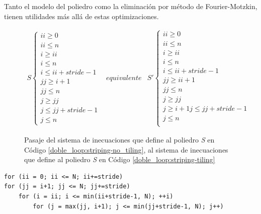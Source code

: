 \documentclass{article}
\begin{document}
Tanto el modelo del poliedro como la eliminación por método de Fourier-Motzkin, tienen utilidades más allá
de estas optimizaciones.

\begin{figure}
\begin{displaymath}
	\begin{array}{rrr}
		S\left\{
			\begin{array}{r}
			ii\geq 0\\
			ii\leq n\\
			i\geq ii\\
			i\leq n\\
			i\leq ii+stride-1\\
			jj\geq i+1\\
			jj\leq n\\
			j\geq jj\\
			j\leq jj+stride-1\\
			j\leq n
			\end{array}
		\right.
		&
		\textit{equivalente a}
		&
		S'\left\{
			\begin{array}{r}
			ii\geq 0\\
			ii\leq n\\
			i\geq ii\\
			i\leq n\\
			i\leq ii+stride-1\\
			jj\geq ii+1\\
			jj\leq n\\
			j\geq jj\\
			j\geq i+1
			j\leq jj+stride-1\\
			j\leq n\\
			\end{array}
		\right.
	\end{array}
\end{displaymath}
	\caption{Pasaje del sistema de inecuaciones que define al poliedro \textit{S} en Código \ref{doble_loop:striping-no_tiling},
	al sistema de inecuaciones que define al poliedro \textit{S} en Código \ref{doble_loop:striping-tiling}}
	\label{fig:fourier_motzkin}
\end{figure}

\begin{lstlisting}[style=CStyle,label=doble_loop:striping-tiling,caption=doble loop con loop-tiling]
for (ii = 0; ii <= N; ii+=stride)
for (jj = i+1; jj <= N; jj+=stride)
	for (i = ii; i <= min(ii+stride-1, N); ++i)
		for (j = max(jj, i+1); j <= min(jj+stride-1, N); j++)
\end{lstlisting}
\end{document}
